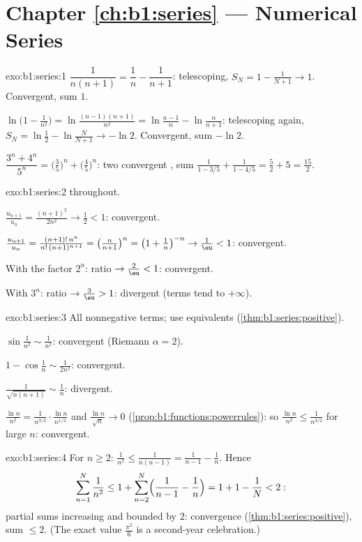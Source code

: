 \section*{Chapter \ref{ch:b1:series} --- Numerical Series}

\begin{solution}{exo:b1:series:1}
$\dfrac{1}{n(n+1)} = \dfrac1n - \dfrac{1}{n+1}$: telescoping, $S_N =
1 - \frac{1}{N+1} \to 1$. Convergent, sum $1$.

$\ln\bigl(1 - \frac{1}{n^2}\bigr) = \ln\frac{(n-1)(n+1)}{n^2} =
\ln\frac{n-1}{n} - \ln\frac{n}{n+1}$: telescoping again, $S_N =
\ln\frac12 - \ln\frac{N}{N+1} \to -\ln 2$. Convergent, sum $-\ln 2$.

$\dfrac{3^n + 4^n}{5^n} = \bigl(\frac35\bigr)^n +
\bigl(\frac45\bigr)^n$: two convergent , sum
$\frac{1}{1 - 3/5} + \frac{1}{1 - 4/5} = \frac52 + 5 = \frac{15}{2}$.
\end{solution}

\begin{solution}{exo:b1:series:2}
 throughout.

$\frac{u_{n+1}}{u_n} = \frac{(n+1)^2}{2n^2} \to \frac12 < 1$:
convergent.

$\frac{u_{n+1}}{u_n} = \frac{(n+1)!\,n^n}{n!\,(n+1)^{n+1}} =
\bigl(\frac{n}{n+1}\bigr)^n = \bigl(1 + \frac1n\bigr)^{-n} \to
\frac1\eu < 1$: convergent.

With the factor $2^n$: ratio $\to \frac2\eu < 1$: convergent.

With $3^n$: ratio $\to \frac3\eu > 1$: divergent (terms tend to
$+\infty$).
\end{solution}

\begin{solution}{exo:b1:series:3}
All nonnegative terms; use equivalents
(\cref{thm:b1:series:positive}).

$\sin\frac{1}{n^2} \sim \frac{1}{n^2}$: convergent (Riemann $\alpha
= 2$).

$1 - \cos\frac1n \sim \frac{1}{2n^2}$: convergent.

$\frac{1}{\sqrt{n(n+1)}} \sim \frac1n$: divergent.

$\frac{\ln n}{n^2} = \frac{1}{n^{3/2}}\cdot\frac{\ln n}{n^{1/2}}$
and $\frac{\ln n}{\sqrt n} \to 0$
(\cref{prop:b1:functions:powerrules}): so $\frac{\ln n}{n^2} \leq
\frac{1}{n^{3/2}}$ for large $n$: convergent.
\end{solution}

\begin{solution}{exo:b1:series:4}
For $n \geq 2$: $\frac{1}{n^2} \leq \frac{1}{n(n-1)} =
\frac{1}{n-1} - \frac1n$. Hence
\[
\sum_{n=1}^{N} \frac{1}{n^2} \leq 1 + \sum_{n=2}^{N}
\Bigl(\frac{1}{n-1} - \frac1n\Bigr) = 1 + 1 - \frac1N < 2 :
\]
partial sums increasing and bounded by $2$: convergence
(\cref{thm:b1:series:positive}), sum $\leq 2$. (The exact value
$\frac{\pi^2}{6}$ is a second-year celebration.)
\end{solution}

